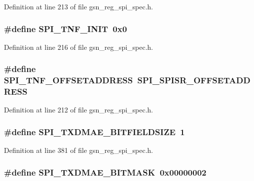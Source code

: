 Definition at line 213 of file gsn\_\-reg\_\-spi\_\-spec.h.

\hypertarget{a00573_ab3aa49c50909b34ccbad40561d371f6b}{
\subsubsection[{SPI\_\-TNF\_\-INIT}]{\setlength{\rightskip}{0pt plus 5cm}\#define SPI\_\-TNF\_\-INIT~0x0}}
\label{a00573_ab3aa49c50909b34ccbad40561d371f6b}


Definition at line 216 of file gsn\_\-reg\_\-spi\_\-spec.h.

\hypertarget{a00573_a280896b40e0248f0f8d83c6480ec81c0}{
\subsubsection[{SPI\_\-TNF\_\-OFFSETADDRESS}]{\setlength{\rightskip}{0pt plus 5cm}\#define SPI\_\-TNF\_\-OFFSETADDRESS~SPI\_\-SPISR\_\-OFFSETADDRESS}}
\label{a00573_a280896b40e0248f0f8d83c6480ec81c0}


Definition at line 212 of file gsn\_\-reg\_\-spi\_\-spec.h.

\hypertarget{a00573_a6fe9249c6f7da451405b7baf2c381f37}{
\subsubsection[{SPI\_\-TXDMAE\_\-BITFIELDSIZE}]{\setlength{\rightskip}{0pt plus 5cm}\#define SPI\_\-TXDMAE\_\-BITFIELDSIZE~1}}
\label{a00573_a6fe9249c6f7da451405b7baf2c381f37}


Definition at line 381 of file gsn\_\-reg\_\-spi\_\-spec.h.

\hypertarget{a00573_aeb497e174fcd5bfcbf5ae15b8b67879d}{
\subsubsection[{SPI\_\-TXDMAE\_\-BITMASK}]{\setlength{\rightskip}{0pt plus 5cm}\#define SPI\_\-TXDMAE\_\-BITMASK~0x00000002}}
\label{a00573_aeb497e174fcd5bfcbf5ae15b8b67879d}


